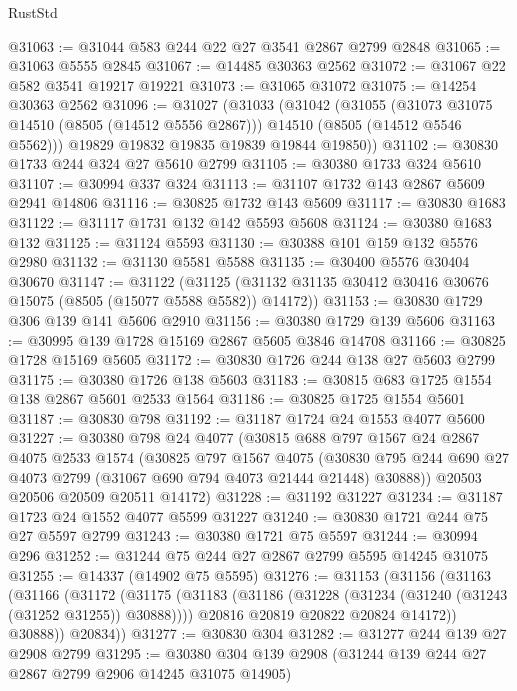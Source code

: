 \begin{lexlean}{RustStd}
\begin{coremodule}
@31063 := @31044 @583 @244 @22 @27 @3541 @2867 @2799 @2848
@31065 := @31063 @5555 @2845
@31067 := @14485 @30363 @2562
@31072 := @31067 @22 @582 @3541 @19217 @19221
@31073 := @31065 @31072
@31075 := @14254 @30363 @2562
@31096 := @31027
    (@31033
      (@31042
        (@31055
          (@31073 @31075 @14510 (@8505 (@14512 @5556 @2867)))
          @14510
          (@8505 (@14512 @5546 @5562)))
        @19829
        @19832
        @19835
        @19839
        @19844
        @19850))
@31102 := @30830 @1733 @244 @324 @27 @5610 @2799
@31105 := @30380 @1733 @324 @5610
@31107 := @30994 @337 @324
@31113 := @31107 @1732 @143 @2867 @5609 @2941 @14806
@31116 := @30825 @1732 @143 @5609
@31117 := @30830 @1683
@31122 := @31117 @1731 @132 @142 @5593 @5608
@31124 := @30380 @1683 @132
@31125 := @31124 @5593
@31130 := @30388 @101 @159 @132 @5576 @2980
@31132 := @31130 @5581 @5588
@31135 := @30400 @5576 @30404 @30670
@31147 := @31122
    (@31125 (@31132 @31135 @30412 @30416 @30676 @15075 (@8505 (@15077 @5588 @5582)) @14172))
@31153 := @30830 @1729 @306 @139 @141 @5606 @2910
@31156 := @30380 @1729 @139 @5606
@31163 := @30995 @139 @1728 @15169 @2867 @5605 @3846 @14708
@31166 := @30825 @1728 @15169 @5605
@31172 := @30830 @1726 @244 @138 @27 @5603 @2799
@31175 := @30380 @1726 @138 @5603
@31183 := @30815 @683 @1725 @1554 @138 @2867 @5601 @2533 @1564
@31186 := @30825 @1725 @1554 @5601
@31187 := @30830 @798
@31192 := @31187 @1724 @24 @1553 @4077 @5600
@31227 := @30380
    @798
    @24
    @4077
    (@30815
      @688
      @797
      @1567
      @24
      @2867
      @4075
      @2533
      @1574
      (@30825
        @797
        @1567
        @4075
        (@30830 @795 @244 @690 @27 @4073 @2799 (@31067 @690 @794 @4073 @21444 @21448) @30888))
      @20503
      @20506
      @20509
      @20511
      @14172)
@31228 := @31192 @31227
@31234 := @31187 @1723 @24 @1552 @4077 @5599 @31227
@31240 := @30830 @1721 @244 @75 @27 @5597 @2799
@31243 := @30380 @1721 @75 @5597
@31244 := @30994 @296
@31252 := @31244 @75 @244 @27 @2867 @2799 @5595 @14245 @31075
@31255 := @14337 (@14902 @75 @5595)
@31276 := @31153
    (@31156
      (@31163
        (@31166
          (@31172
            (@31175
              (@31183
                (@31186 (@31228 (@31234 (@31240 (@31243 (@31252 @31255)) @30888))))
                @20816
                @20819
                @20822
                @20824
                @14172))
            @30888))
        @20834))
@31277 := @30830 @304
@31282 := @31277 @244 @139 @27 @2908 @2799
@31295 := @30380 @304 @139 @2908 (@31244 @139 @244 @27 @2867 @2799 @2906 @14245 @31075 @14905)

\end{coremodule}
\end{lexlean}
